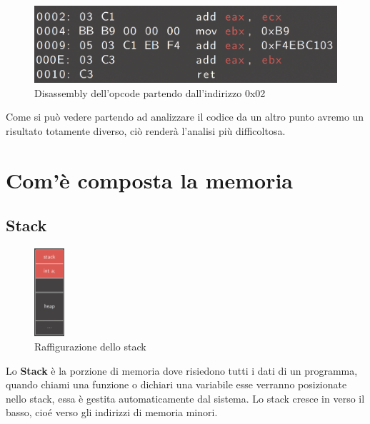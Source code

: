 \begin{figure}[h!]
    \centering
    \includegraphics[width=.6\linewidth]{res/obfuscated_code2.png}
    \caption{Disassembly dell'opcode partendo dall'indirizzo 0x02}
\end{figure}
Come si può vedere partendo ad analizzare il codice da un altro punto avremo un risultato totamente diverso, ciò renderà l'analisi più difficoltosa.
\clearpage
\section{Com'è composta la memoria}

\subsection{Stack}
\begin{figure}
    \begin{center}
        \includegraphics[width=0.1\textwidth]{res/stack.png}
        \caption{Raffigurazione dello stack}
    \end{center}
\end{figure}
Lo \textbf{Stack} è la porzione di memoria dove risiedono tutti i dati di un programma, quando chiami una funzione o dichiari una variabile esse verranno posizionate nello stack, essa è gestita automaticamente dal sistema.
Lo stack cresce in verso il basso, cioé verso gli indirizzi di memoria minori.

